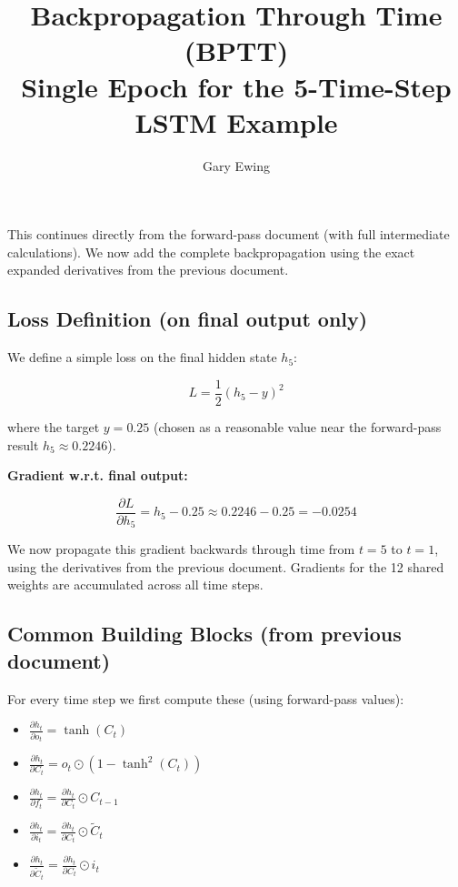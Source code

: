 \documentclass[12pt]{article}
\begin{document}
\title{Backpropagation Through Time (BPTT) \\ Single Epoch for the 5-Time-Step LSTM Example}
\author{Gary Ewing}
\date{}
\maketitle

This continues directly from the forward-pass document (with full intermediate calculations). We now add the complete backpropagation using the exact expanded derivatives from the previous document.

\subsection*{Loss Definition (on final output only)}

We define a simple loss on the final hidden state $h_5$:

\begin{equation*}
L = \frac{1}{2} (h_5 - y)^2
\end{equation*}

where the target $y = 0.25$ (chosen as a reasonable value near the forward-pass result $h_5 \approx 0.2246$).

\textbf{Gradient w.r.t. final output:}

\begin{equation*}
\frac{\partial L}{\partial h_5} = h_5 - 0.25 \approx 0.2246 - 0.25 = -0.0254
\end{equation*}

We now propagate this gradient backwards through time from $t=5$ to $t=1$, using the derivatives from the previous document. Gradients for the 12 shared weights are accumulated across all time steps.

\subsection*{Common Building Blocks (from previous document)}

For every time step we first compute these (using forward-pass values):

\begin{itemize}[leftmargin=*]
    \item $\frac{\partial h_t}{\partial o_t} = \tanh(C_t)$
    \item $\frac{\partial h_t}{\partial C_t} = o_t \odot (1 - \tanh^2(C_t))$
    \item $\frac{\partial h_t}{\partial f_t} = \frac{\partial h_t}{\partial C_t} \odot C_{t-1}$
    \item $\frac{\partial h_t}{\partial i_t} = \frac{\partial h_t}{\partial C_t} \odot \tilde{C}_t$
    \item $\frac{\partial h_t}{\partial \tilde{C}_t} = \frac{\partial h_t}{\partial C_t} \odot i_t$
\end{itemize}
\end{document}
